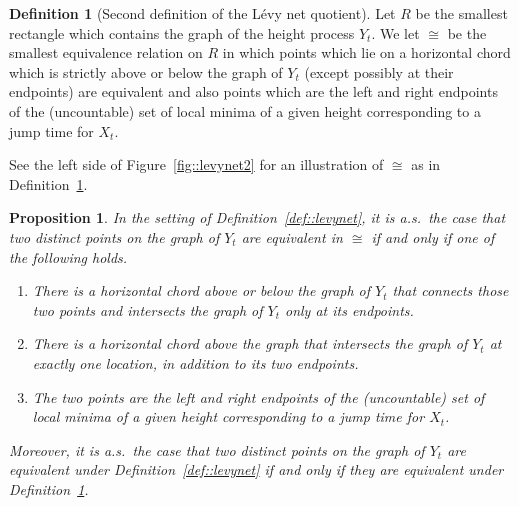 \documentclass[10pt]{amsart}
\theoremstyle{plain}
\numberwithin{theorem}{section}
\newtheorem{proposition}[theorem]{Proposition}
\theoremstyle{definition}
\newtheorem{definition}[theorem]{Definition}
\begin{document}
\begin{definition}[Second definition of the Lévy net quotient]
\label{def::levynet2}
Let $R$ be the smallest rectangle which contains the graph of the height process $Y_t$. We let $\cong$ be the smallest equivalence relation on $R$ in which points which lie on a horizontal chord which is strictly above or below the graph of $Y_t$ (except possibly at their endpoints) are equivalent and also points which are the left and right endpoints of the (uncountable) set of local minima of a given height corresponding to a jump time for $X_t$.
\end{definition}
See the left side of Figure~\ref{fig::levynet2} for an illustration of $\cong$ as in Definition~\ref{def::levynet2}.

\begin{proposition}
\label{prop::graphplushorizchords}
In the setting of Definition~\ref{def::levynet}, it is a.s.\ the case that two distinct points on the graph of $Y_t$ are equivalent in $\cong$ if and only if one of the following holds.
\begin{enumerate}
\item\label{it:equiv1} There is a horizontal chord above or below the graph of $Y_t$ that connects those two points and intersects the graph of $Y_t$ only at its endpoints.
\item\label{it:equiv2} There is a horizontal chord above the graph that intersects the graph of $Y_t$ at exactly one location, in addition to its two endpoints.
\item\label{it:equiv3} The two points are the left and right endpoints of the (uncountable) set of local minima of a given height corresponding to a jump time for $X_t$.
\end{enumerate}
Moreover, it is a.s.\ the case that two distinct points on the graph of $Y_t$ are equivalent under Definition~\ref{def::levynet} if and only if they are equivalent under Definition~\ref{def::levynet2}.
\end{proposition}
\end{document}
